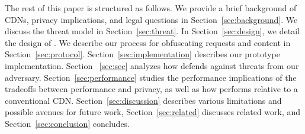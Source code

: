 %

The rest of this paper is structured as follows. We provide a brief background
of CDNs, privacy implications, and legal questions in
Section~\ref{sec:background}. We discuss the threat model in
Section~\ref{sec:threat}. In Section~\ref{sec:design}, we detail the design of
\system{}. We describe our process for obfuscating requests and content in
Section~\ref{sec:protocol}.  
Section~\ref{sec:implementation} describes our prototype implementation. Section~
\ref{sec:sec} analyzes how \system{}
defends against threats from our adversary. Section~\ref{sec:performance}
studies the performance implications of the tradeoffs between performance and
privacy, as well as how \system{} performs relative to a conventional CDN.
Section~\ref{sec:discussion} describes various limitations and possible
avenues for future work, Section~\ref{sec:related} discusses related work, and
Section~\ref{sec:conclusion} concludes.


